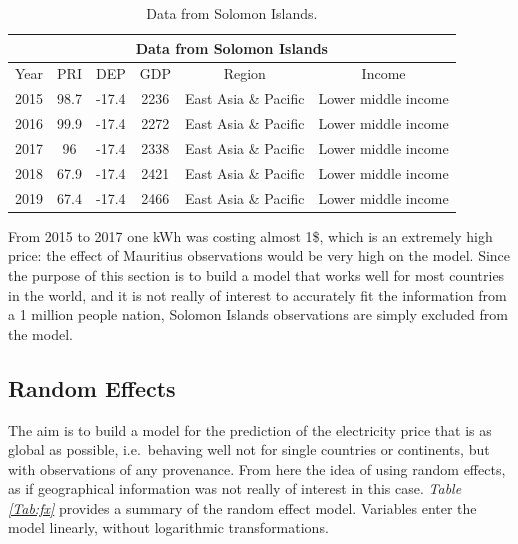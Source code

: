 \documentclass[a4paper,12pt]{book}
\begin{document}
\begin{table}[tb]
\begin{center}
\begin{tabular}{|c|c|c|c|c|c|}
\hline
\multicolumn{6}{|c|}{Data from Solomon Islands}\\
\hline
Year&PRI&DEP&GDP&Region&Income\\
\hline
2015&98.7&-17.4&2236&East Asia \& Pacific&Lower middle income\\
2016&99.9&-17.4&2272&East Asia \& Pacific&Lower middle income\\
2017&96&-17.4&2338&East Asia \& Pacific&Lower middle income\\
2018&67.9&-17.4&2421&East Asia \& Pacific&Lower middle income\\
2019&67.4&-17.4&2466&East Asia \& Pacific&Lower middle income\\
\hline
\end{tabular}
\caption{Data from Solomon Islands.}
\label{Tab:solomon}
\end{center}
\end{table}

From 2015 to 2017 one kWh was costing almost 1\$, which is an extremely high price: the effect of Mauritius observations would be very high on the model. Since the purpose of this section is to build a model that works well for most countries in the world, and it is not really of interest to accurately fit the information from a 1 million people nation, Solomon Islands observations are simply excluded from the model.

\subsection{Random Effects}

The aim is to build a model for the prediction of the electricity price that is as global as possible, i.e.\ behaving well not for single countries or continents, but with observations of any provenance. From here the idea of using random effects, as if geographical information was not really of interest in this case. \textit{Table \ref{Tab:fx}} provides a summary of the random effect model. Variables enter the model linearly, without logarithmic transformations.
\end{document}
